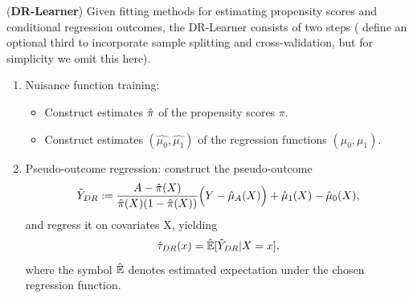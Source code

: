 \documentclass[../thesis.tex]{subfiles}
\begin{document}
\begin{technique}{(\textbf{DR-Learner})}
Given fitting methods for estimating propensity scores and conditional regression outcomes, the DR-Learner consists of two steps (\citet{kennedy_towards_2022} define an optional third to incorporate sample splitting and cross-validation, but for simplicity we omit this here).
\begin{enumerate}
    \item Nuisance function training:
    \begin{itemize}
        \item Construct estimates $\hat{\pi}$ of the propensity scores $\pi$.
        \item Construct estimates $(\hat{\mu_0}, \hat{\mu_1})$ of the regression functions $(\mu_0, \mu_1)$.
    \end{itemize}
    \item Pseudo-outcome regression: construct the pseudo-outcome
    \[\Tilde{Y}_{DR} := \frac{A - \hat{\pi}(X)}{\hat{\pi}(X)(1-\hat{\pi}(X))}\Big( Y - \hat{\mu}_A(X)\Big) + \hat{\mu}_1(X) - \hat{\mu}_0(X),\]
    and regress it on covariates X, yielding
    \[\hat{\tau}_{DR}(x) = \hat{\mathbb{E}}[\Tilde{Y}_{DR} | X = x],\]
    where the symbol $\hat{\mathbb{E}}$ denotes estimated expectation under the chosen regression function.
\end{enumerate}
\end{technique}
\end{document}
